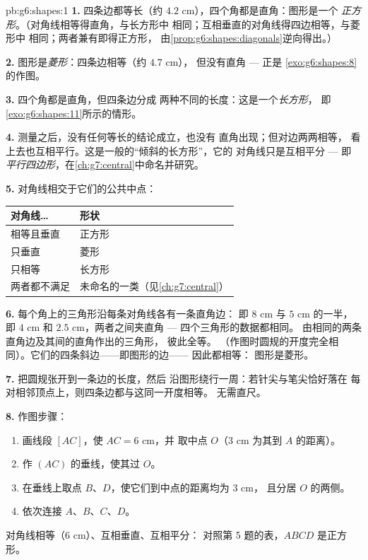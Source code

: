 \begin{solution}{pb:g6:shapes:1}
\textbf{1.} 四条边都等长（约
$4.2$ cm），四个角都是直角：图形是一个
\emph{正方形}。（对角线相等得直角，与长方形中
相同；互相垂直的对角线得四边相等，与菱形中
相同；两者兼有即得正方形，
由\cref{prop:g6:shapes:diagonals}逆向得出。）

\textbf{2.} 图形是\emph{菱形}：四条边相等（约 $4.7$ cm），
但没有直角 --- 正是
\cref{exo:g6:shapes:8}的作图。

\textbf{3.} 四个角都是直角，但四条边分成
两种不同的长度：这是一个\emph{长方形}，
即\cref{exo:g6:shapes:11}所示的情形。

\textbf{4.} 测量之后，没有任何等长的结论成立，也没有
直角出现；但对边两两相等，
看上去也互相平行。这是一般的“倾斜的长方形”，它的
对角线只是互相平分 --- 即
\emph{平行四边形}，在\cref{ch:g7:central}中命名并研究。

\textbf{5.} 对角线相交于它们的公共中点：
\begin{center}
\renewcommand{\arraystretch}{1.2}
\begin{tabular}{l|l}
对角线\dots & 形状 \\
\hline
相等且垂直 & 正方形 \\
只垂直 & 菱形 \\
只相等 & 长方形 \\
两者都不满足 & 未命名的一类（见\cref{ch:g7:central}） \\
\end{tabular}
\end{center}

\textbf{6.} 每个角上的三角形沿每条对角线各有一条直角边：
即 $8$ cm 与 $5$ cm 的一半，即 $4$ cm
和 $2.5$ cm，两者之间夹直角 --- 四个三角形的数据都相同。
由相同的两条直角边及其间的直角作出的三角形，
彼此全等。
（作图时圆规的开度完全相同）。它们的四条斜边——即图形的边——
因此都相等：
图形是菱形。

\textbf{7.} 把圆规张开到一条边的长度，然后
沿图形绕行一周：若针尖与笔尖恰好落在
每对相邻顶点上，则四条边都与这同一开度相等。
无需直尺。

\textbf{8.} 作图步骤：
\begin{enumerate}
  \item 画线段 $[AC]$，使 $AC = 6$ cm，并
        取中点 $O$（$3$ cm 为其到 $A$ 的距离）。
  \item 作 $(AC)$ 的垂线，使其过 $O$。
  \item 在垂线上取点 $B$、$D$，使它们到中点的距离均为 $3$ cm，
        且分居 $O$ 的两侧。
  \item 依次连接 $A$、$B$、$C$、$D$。
\end{enumerate}
对角线相等（$6$ cm）、互相垂直、互相平分：
对照第 5 题的表，$ABCD$ 是正方形。


\end{solution}
